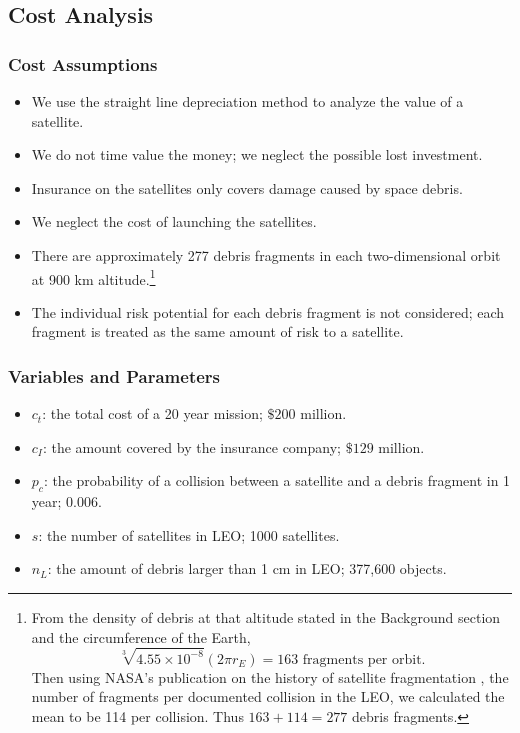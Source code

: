 \documentclass[12pt]{scrartcl}
\begin{document}
\subsection{Cost Analysis}
\subsubsection{Cost Assumptions}
\begin{itemize}
\item	We use the straight line depreciation method to analyze the value of a satellite.
\item	We do not time value the money; we neglect the possible lost investment.
\item   Insurance on the satellites only covers damage caused by space debris.
\item	We neglect the cost of launching the satellites.
\item	There are approximately 277 debris fragments in each two-dimensional orbit at 900 km altitude.\footnote{From the density of debris at that altitude\cite{fragments} stated in the Background section and the circumference of the Earth, \[\sqrt[3]{4.55 \times 10^{-8}}(2\pi r_E)=163 \text{ fragments per orbit.}\] Then using NASA's publication on the history of satellite fragmentation \cite{fragments}, the number of fragments per documented collision in the LEO, we calculated the mean to be 114 per collision. Thus \(163+114=277\) debris fragments.}
\item   The individual risk potential for each debris fragment is not considered; each fragment is treated as the same amount of risk to a satellite.
\end{itemize}
\subsubsection{Variables and Parameters}
\begin{itemize}
    \item \(c_t\): the total cost of a 20 year mission; \(\$200\) million.
    \item \(c_I\): the amount covered by the insurance company; \(\$129\) million.
    \item \(p_c\): the probability of a collision between a satellite and a debris fragment in 1 year; 0.006.
    \item \(s\): the number of satellites in LEO; 1000 satellites.
    \item \(n_L\): the amount of debris larger than 1 cm in LEO; 377,600 objects.
\end{itemize}
\end{document}
